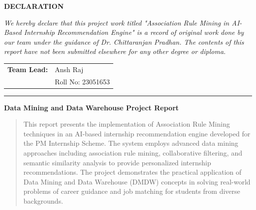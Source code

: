 \documentclass[12pt,a4paper]{article}
\begin{document}
\begin{titlepage}
    \vspace{2cm}
    
    {\Large \textbf{DECLARATION}}\\[0.5cm]
    \begin{minipage}{0.8\textwidth}
        \centering
        \textit{We hereby declare that this project work titled "Association Rule Mining in AI-Based Internship Recommendation Engine" is a record of original work done by our team under the guidance of Dr. Chittaranjan Pradhan. The contents of this report have not been submitted elsewhere for any other degree or diploma.}
    \end{minipage}
    
    \vspace{1cm}
    
    \begin{minipage}{0.8\textwidth}
        \centering
        \begin{tabular}{ll}
            \textbf{Team Lead:} 
            & Ansh Raj \\
            & Roll No: 23051653 \\
        \end{tabular}
    \end{minipage}
    
    \vspace{1cm}
    
   
    
    \vfill
    
    \rule{\textwidth}{0.4pt}
    \vspace{0.5cm}
    {\large \textbf{Data Mining and Data Warehouse Project Report}}
    
\end{titlepage}

\newpage
\tableofcontents
\newpage

\begin{abstract}
This report presents the implementation of Association Rule Mining techniques in an AI-based internship recommendation engine developed for the PM Internship Scheme. The system employs advanced data mining approaches including association rule mining, collaborative filtering, and semantic similarity analysis to provide personalized internship recommendations. The project demonstrates the practical application of Data Mining and Data Warehouse (DMDW) concepts in solving real-world problems of career guidance and job matching for students from diverse backgrounds.
\end{abstract}
\end{document}
